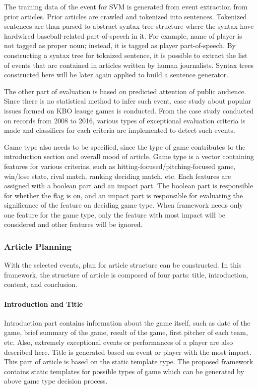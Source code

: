 \documentclass[11pt,letterpaper]{article}
\begin{document}
The training data of the event for SVM is generated from event extraction from prior articles. Prior articles are crawled and tokenized into sentences. Tokenized sentences are than parsed to abstract syntax tree structure where the syntax have hardwired baseball-related part-of-speech in it. For example, name of player is not tagged as proper noun; instead, it is tagged as player part-of-speech. By constructing a syntax tree for toknized sentence, it is possible to extract the list of events that are contained in articles written by human journalists. Syntax trees constructed here will be later again applied to build a sentence generator. 

The other part of evaluation is based on predicted attention of public audience. Since there is no statistical method to infer such event, case study about popular issues formed on KBO leauge games is conducted. From the case study conducted on records from 2008 to 2016, various types of exceptional evaluation criteria is made and classifiers for each criteria are implemented to detect such events.

Game type also needs to be specified, since the type of game contributes to the introduction section and overall mood of article. Game type is a vector containing features for various criterias, such as hitting-focused/pitching-focused game, win/lose state, rival match, ranking deciding match, etc. Each features are assigned with a boolean part and an impact part. The boolean part is responsible for whether the flag is on, and an impact part is responsible for evaluating the significance of the feature on deciding game type. When framework needs only one feature for the game type, only the feature with most impact will be considered and other features will be ignored.

\subsubsection{Article Planning}

With the selected events, plan for article structure can be constructed. In this framework, the structure of article is composed of four parts: title, introduction, content, and conclusion. 

\paragraph{Introduction and Title} 

Introduction part contains information about the game itself, such as date of the game, brief summary of the game, result of the game, first pitcher of each team, etc. Also, extremely exceptional events or performances of a player are also described here. Title is generated based on event or player with the most impact. This part of article is based on the static template type. The proposed framework contains static templates for possible types of game which can be generated by above game type decision process. 
\end{document}

